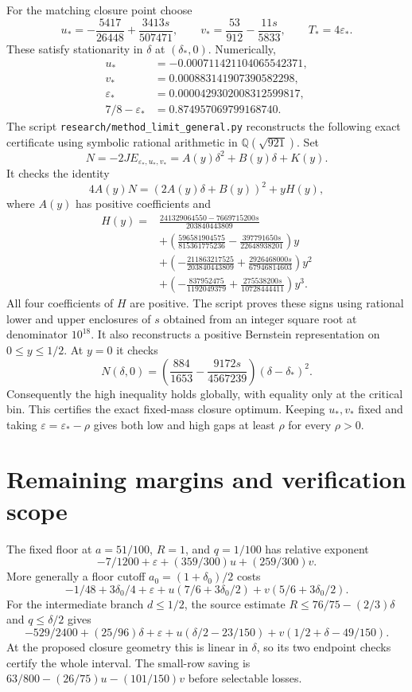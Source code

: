 \documentclass[11pt]{article}
\newcommand{\eps}{\varepsilon}
\begin{document}
For the matching closure point choose
\[
 u_*=-\frac{5417}{26448}+\frac{3413s}{507471},\qquad
 v_*=\frac{53}{912}-\frac{11s}{5833},\qquad T_*=4\eps_*.
\]
These satisfy stationarity in $\delta$ at $(\delta_*,0)$.
Numerically,
\begin{align*}
 u_*&=-0.000711421104065542371,\\
 v_*&= 0.000883141907390582298,\\
 \eps_*&=0.0000429302008312599817,\\
 7/8-\eps_*&=0.874957069799168740.
\end{align*}
The script \texttt{research/method\_limit\_general.py} reconstructs the
following exact certificate using symbolic rational arithmetic in
$\mathbb Q(\sqrt{921})$. Set
\[
 N=-2J E_{\eps_*,u_*,v_*}=A(y)\delta^2+B(y)\delta+K(y).
\]
It checks the identity
\[
 4A(y)N=(2A(y)\delta+B(y))^2+yH(y),
\]
where $A(y)$ has positive coefficients and
\begin{align*}
 H(y)={}&\frac{241329064550-7669715200s}{203840443809}\\
 &+\left(\frac{596581904575}{815361775236}
          -\frac{397791650s}{22648938201}\right)y\\
 &+\left(-\frac{211863217525}{203840443809}
          +\frac{2926468000s}{67946814603}\right)y^2\\
 &+\left(-\frac{837952475}{1192049379}
          +\frac{275538200s}{10728444411}\right)y^3.
\end{align*}
All four coefficients of $H$ are positive. The script proves these
signs using rational lower and upper enclosures of $s$ obtained from
an integer square root at denominator $10^{18}$. It also reconstructs
a positive Bernstein representation on $0\le y\le1/2$.
At $y=0$ it checks
\[
 N(\delta,0)=\left(\frac{884}{1653}
                  -\frac{9172s}{4567239}\right)(\delta-\delta_*)^2.
\]
Consequently the high inequality holds globally, with equality only
at the critical bin. This certifies the exact fixed-mass closure optimum.
Keeping $u_*,v_*$ fixed and taking $\eps=\eps_*-\rho$ gives both
low and high gaps at least $\rho$ for every $\rho>0$.

\section{Remaining margins and verification scope}

The fixed floor at $a=51/100$, $R=1$, and $q=1/100$ has relative
exponent
\[
 -7/1200+\eps+(359/300)u+(259/300)v.
\]
More generally a floor cutoff $a_0=(1+\delta_0)/2$ costs
\[
 -1/48+3\delta_0/4+\eps+
 u(7/6+3\delta_0/2)+v(5/6+3\delta_0/2).
\]
For the intermediate branch $d\le1/2$, the source estimate
$R\le76/75-(2/3)\delta$ and $q\le\delta/2$ gives
\[
 -529/2400+(25/96)\delta+\eps+
 u(\delta/2-23/150)+v(1/2+\delta-49/150).
\]
At the proposed closure geometry this is linear in $\delta$, so its
two endpoint checks certify the whole interval. The small-row saving is
$63/800-(26/75)u-(101/150)v$ before selectable losses.
\end{document}
